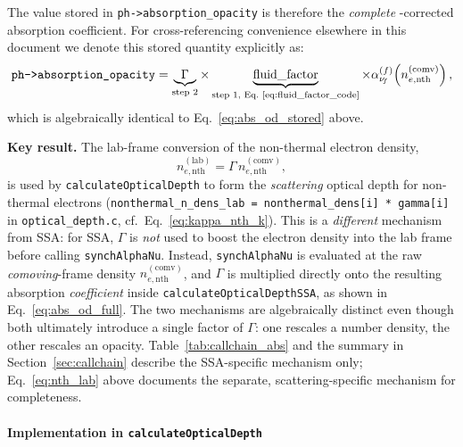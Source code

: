\documentclass[12pt,a4paper]{article}
\newcommand{\nuf}{\nu_{\!f}}
\newcommand{\code}[1]{\texttt{#1}}
\newenvironment{keyresult}{%
	\begin{framed}\noindent\textbf{Key result.}\quad}
	{\end{framed}}
\begin{document}
The value stored in \code{ph->absorption\_opacity} is therefore the
\emph{complete} \citet{abramowicz1991}-corrected absorption coefficient.
For cross-referencing convenience elsewhere in this document we denote
this stored quantity explicitly as:
\begin{equation}
	\code{ph->absorption\_opacity}
	= \underbrace{\Gamma}_{\text{step 2}}
	\times
	\underbrace{\mathrm{fluid\_factor}}_{\text{step 1, Eq.~\eqref{eq:fluid_factor_code}}}
	\times \alpha_{\nuf}^{(f)}\!\left(n_{e,\mathrm{nth}}^{(\mathrm{comv})}\right),
	\label{eq:abs_od_full}
\end{equation}
which is algebraically identical to Eq.~\eqref{eq:abs_od_stored} above.

\begin{keyresult}
	The lab-frame conversion of the non-thermal electron density,
	\begin{equation}
		n_{e,\mathrm{nth}}^{(\mathrm{lab})}
		= \Gamma\, n_{e,\mathrm{nth}}^{(\mathrm{comv})},
		\label{eq:nth_lab}
	\end{equation}
	is used by \code{calculateOpticalDepth} to form the \emph{scattering}
	optical depth for non-thermal electrons
	(\code{nonthermal\_n\_dens\_lab = nonthermal\_dens[i] * gamma[i]}
	in \code{optical\_depth.c}, cf.\ Eq.~\eqref{eq:kappa_nth_k}). This is a
	\emph{different} mechanism from SSA: for SSA, $\Gamma$ is \emph{not}
	used to boost the electron density into the lab frame before calling
	\code{synchAlphaNu}. Instead, \code{synchAlphaNu} is evaluated at the
	raw \emph{comoving}-frame density
	$n_{e,\mathrm{nth}}^{(\mathrm{comv})}$, and $\Gamma$ is multiplied
	directly onto the resulting absorption \emph{coefficient} inside
	\code{calculateOpticalDepthSSA}, as shown in
	Eq.~\eqref{eq:abs_od_full}. The two mechanisms are algebraically
	distinct even though both ultimately introduce a single factor of
	$\Gamma$: one rescales a number density, the other rescales an
	opacity. Table~\ref{tab:callchain_abs} and the summary in
	Section~\ref{sec:callchain} describe the SSA-specific mechanism only;
	Eq.~\eqref{eq:nth_lab} above documents the separate, scattering-specific
	mechanism for completeness.
\end{keyresult}


\paragraph{Implementation in \texttt{calculateOpticalDepth}}
\label{sec:calc_od}
\end{document}
